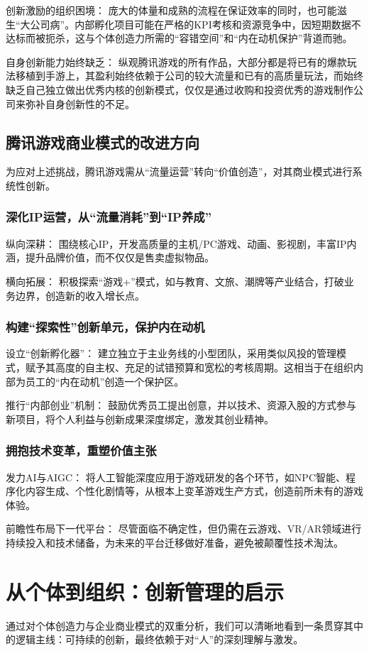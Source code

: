 \documentclass[supercite]{HustGSClassPaper}
\begin{document}
	创新激励的组织困境： 庞大的体量和成熟的流程在保证效率的同时，也可能滋生“大公司病”。内部孵化项目可能在严格的KPI考核和资源竞争中，因短期数据不达标而被扼杀，这与个体创造力所需的“容错空间”和“内在动机保护”背道而驰。
	
	自身创新能力始终缺乏： 纵观腾讯游戏的所有作品，大部分都是将已有的爆款玩法移植到手游上，其盈利始终依赖于公司的较大流量和已有的高质量玩法，而始终缺乏自己独立做出优秀内核的创新模式，仅仅是通过收购和投资优秀的游戏制作公司来弥补自身创新性的不足。
	\subsection{腾讯游戏商业模式的改进方向}
	为应对上述挑战，腾讯游戏需从“流量运营”转向“价值创造”，对其商业模式进行系统性创新。

	\subsubsection{深化IP运营，从“流量消耗”到“IP养成”}

	纵向深耕： 围绕核心IP，开发高质量的主机/PC游戏、动画、影视剧，丰富IP内涵，提升品牌价值，而不仅仅是售卖虚拟物品。
	
	横向拓展： 积极探索“游戏+”模式，如与教育、文旅、潮牌等产业结合，打破业务边界，创造新的收入增长点。
	\subsubsection{构建“探索性”创新单元，保护内在动机}

	设立“创新孵化器”： 建立独立于主业务线的小型团队，采用类似风投的管理模式，赋予其高度的自主权、充足的试错预算和宽松的考核周期。这相当于在组织内部为员工的“内在动机”创造一个保护区。
	
	推行“内部创业”机制： 鼓励优秀员工提出创意，并以技术、资源入股的方式参与新项目，将个人利益与创新成果深度绑定，激发其创业精神。
	\subsubsection{拥抱技术变革，重塑价值主张}

	发力AI与AIGC： 将人工智能深度应用于游戏研发的各个环节，如NPC智能、程序化内容生成、个性化剧情等，从根本上变革游戏生产方式，创造前所未有的游戏体验。
	
	前瞻性布局下一代平台： 尽管面临不确定性，但仍需在云游戏、VR/AR领域进行持续投入和技术储备，为未来的平台迁移做好准备，避免被颠覆性技术淘汰。
	\section{从个体到组织：创新管理的启示}
	通过对个体创造力与企业商业模式的双重分析，我们可以清晰地看到一条贯穿其中的逻辑主线：可持续的创新，最终依赖于对“人”的深刻理解与激发。
\end{document}

